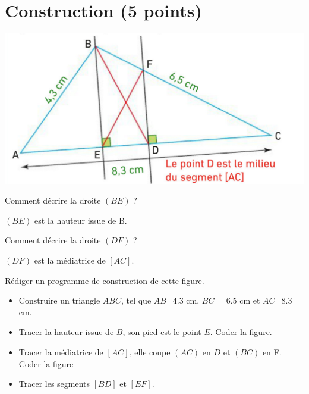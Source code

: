 \section{Construction (5 points)}

\begin{center}
	\includegraphics[scale=0.3]{img/triangle}
\end{center}

\begin{questions}
	
	\question[1\half] Comment décrire la droite $(BE)$ ?
	\begin{solution}
		$(BE)$ est la hauteur issue de B.
	\end{solution}
	
	\question[1\half] Comment décrire la droite $(DF)$ ?
	\begin{solution}
		$(DF)$ est la médiatrice de $[AC]$.
	\end{solution}
	
	\question[2] Rédiger un programme de construction de cette figure.
	\begin{solution}
		\begin{itemize}
			\item Construire un triangle $ABC$, tel que $AB$=\num{4.3} cm, $BC$ = \num{6.5} cm et $AC$=\num{8.3} cm.
			
			\item Tracer la hauteur issue de $B$, son pied est le point $E$. Coder la figure.
			
			\item Tracer la médiatrice de $[AC]$, elle coupe $(AC)$ en $D$ et $(BC)$ en F. Coder la figure
			
			\item Tracer les segments $[BD]$ et $[EF]$. 
		\end{itemize}
	\end{solution}
	
	
\end{questions}
  